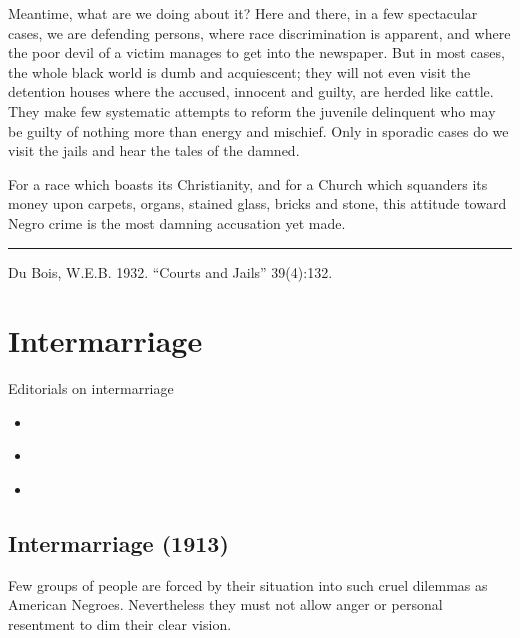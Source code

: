 \documentclass[letterpaper,10pt,english]{jupyterBook}
\begin{document}
\sphinxAtStartPar
Meantime, what are we doing about it? Here and there, in a few spectacular cases, we are defending persons, where race discrimination is apparent, and where the poor devil of a victim manages to get into the newspaper. But in most cases, the whole black world is dumb and acquiescent; they will not even visit the detention houses where the accused, innocent and guilty, are herded like cattle. They make few systematic attempts to reform the juvenile delinquent who may be guilty of nothing more than energy and mischief. Only in sporadic cases do we visit the jails and hear the tales of the damned.

\sphinxAtStartPar
For a race which boasts its Christianity, and for a Church which squanders its money upon carpets, organs, stained glass, bricks and stone, this attitude toward Negro crime is the most damning accusation yet made.


\bigskip\hrule\bigskip


\sphinxAtStartPar
{} Du Bois, W.E.B. 1932. “Courts and Jails” 39(4):132.


\section{Intermarriage}
\label{\detokenize{Sections/intermarriage:intermarriage}}\label{\detokenize{Sections/intermarriage::doc}}
\sphinxAtStartPar
Editorials on intermarriage
\begin{itemize}
\item {} 
\sphinxAtStartPar
{\hyperref[\detokenize{Volumes/05/04/intermarriage::doc}]{}}

\item {} 
\sphinxAtStartPar
{\hyperref[\detokenize{Volumes/19/03/sex_equality::doc}]{}}

\item {} 
\sphinxAtStartPar
{\hyperref[\detokenize{Volumes/31/05/correspondence::doc}]{}}

\end{itemize}


\subsection{Intermarriage (1913)}
\label{\detokenize{Volumes/05/04/intermarriage:intermarriage-1913}}\label{\detokenize{Volumes/05/04/intermarriage::doc}}
\sphinxAtStartPar
Few  groups of people are forced by their situation into such cruel dilem­mas as American Ne­groes. Nevertheless they must not allow anger or personal resentment to dim their clear vision.
\end{document}
